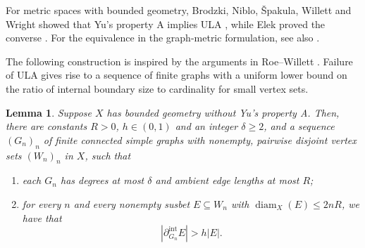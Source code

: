 \documentclass[11pt,a4paper]{article}
\newtheorem{lemma}[theorem]{Lemma}
\theoremstyle{definition}\newtheorem{definition}[theorem]{Definition}
\theoremstyle{remark}\newtheorem{remark}[theorem]{Remark}
\begin{document}
For metric spaces with bounded geometry, Brodzki, Niblo, \v{S}pakula, Willett and Wright showed that Yu's property A implies ULA
\cite[Proposition 3.2 and Lemma 2.7]{BNSWW}, while Elek proved the
converse \cite[Theorem 1]{Elek}. For the equivalence in the
graph-metric formulation, see also \cite[Theorem 1]{ElekTimar}.




The following construction is inspired by the arguments in Roe--Willett \cite{RW}. Failure of ULA gives rise to a sequence of finite graphs with a uniform lower bound on the ratio of internal boundary size to cardinality for small vertex sets. 
\begin{lemma}\label{lem:witnesses}
Suppose $X$ has bounded geometry without Yu's property A. Then, there are
constants $R>0$, $h\in(0,1)$ and an integer $\delta\ge2$, and a sequence
$(G_n)_n$ of finite connected simple graphs with nonempty,
pairwise disjoint vertex sets $(W_n)_n$ in $X$, such that 

\begin{enumerate}
\item[(1)] each $G_n$ has degrees
at most $\delta$ and ambient edge lengths at most $R$;
\item[(2)] for every $n$ and every nonempty susbet
$E\subseteq W_n$ with
$\operatorname{diam}_X(E)\le2nR$, we have that
\begin{equation}\label{eq:boundary}
|\partial_{G_n}^{\mathrm{int}}E|>h|E|.
\end{equation}

\end{enumerate}
\end{lemma}
\end{document}
